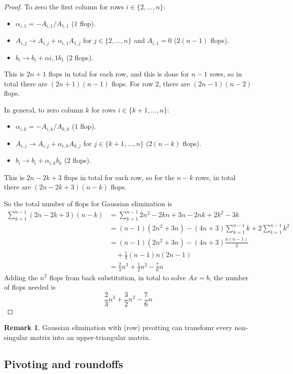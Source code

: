 \documentclass[12pt,a4paper]{article}
\theoremstyle{definition}
\newtheorem*{remark}{Remark}
\begin{document}
\begin{proof}
	To zero the first column for rows $i \in \{ 2, \dots, n \}$:
	\begin{itemize}
		\item $\alpha_{i, 1} = -A_{i, 1} / A_{1, 1}$ ($1$ flop).
		\item $A_{i, j} \rightarrow A_{i, j} + \alpha_{i, 1} A_{1, j}$ for $j \in \{ 2, \dots, n \}$ and $A_{i, 1} = 0$ ($2(n - 1)$ flops).
		\item $b_i \rightarrow b_i + \alpha{i, 1} b_1$ ($2$ flops).
	\end{itemize}
	This is $2n + 1$ flops in total for each row, and this is done for $n - 1$ rows, so in total there are $(2n + 1)(n - 1)$ flops. For row $2$, there are $(2n - 1)(n - 2)$ flops.

	In general, to zero column $k$ for rows $i \in \{ k + 1, \dots, n \}$:
	\begin{itemize}
		\item $\alpha_{i, k} = -A_{i, k} / A_{k, k}$ ($1$ flop).
		\item $A_{i, j} \rightarrow A_{i, j} + \alpha_{i, k} A_{k, j}$ for $j \in \{ k + 1, \dots, n \}$ ($2(n - k)$ flops).
		\item $b_i \rightarrow b_i + \alpha_{i, k} b_k$ ($2$ flops).
	\end{itemize}
	This is $2n - 2k + 3$ flops in total for each row, so for the $n - k$ rows, in total there are $(2n - 2k + 3)(n - k)$ flops.

	So the total number of flops for Gaussian elimination is
	\[
		\begin{aligned}
			\sum_{k = 1}^{n - 1} (2n - 2k + 3)(n - k)
				& = \sum_{k = 1}^{n - 1} 2n^2 - 2kn + 3n - 2nk + 2k^2 - 3k \\
				& = (n - 1)(2n^2 + 3n) - (4n + 3) \sum_{k = 1}^{n - 1} k + 2 \sum_{k = 1}^{n - 1} k^2 \\
				& = (n - 1)(2n^2 + 3n) - (4n + 3) \frac{n(n - 1)}{2} \\
				&\quad + \frac{1}{3} (n - 1) n (2n - 1) \\
				& = \frac{2}{3} n^3 + \frac{1}{2} n^2 - \frac{7}{6} n
		\end{aligned}
	\]
	Adding the $n^2$ flops from back substitution, in total to solve $Ax = b$, the number of flops needed is
	\[
		\frac{2}{3} n^3	+ \frac{3}{2} n^2 - \frac{7}{6} n
	\]
\end{proof}

\begin{remark}
	Gaussian elimination with (row) pivotting can transfomr every non-singular matrix into an upper-triangular matrix.
\end{remark}

\subsection{Pivoting and roundoffs}
\end{document}
